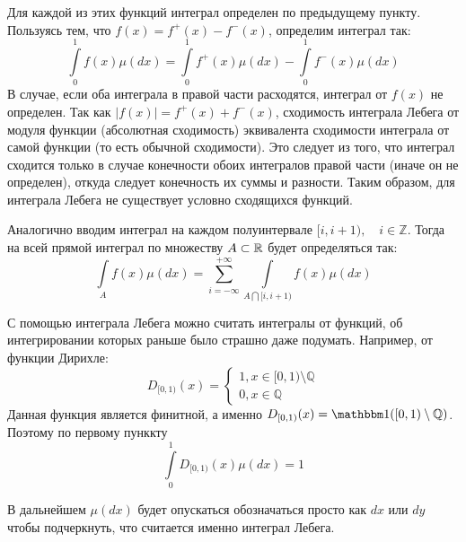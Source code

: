 \begin{itemize}
	Для каждой из этих функций интеграл определен по предыдущему пункту. Пользуясь тем, что $f(x) = f^+(x) - f^-(x)$, определим интеграл так:
	$$  \int\limits_0^1 f(x) \mu(dx) =  \int\limits_0^1 f^+(x) \mu(dx) - \int\limits_0^1 f^-(x) \mu(dx) $$
	В случае, если оба интеграла в правой части расходятся, интеграл от $f(x)$ не определен. 
	Так как $|f(x)| = f^+(x) + f^-(x)$, сходимость интеграла Лебега от модуля функции (абсолютная сходимость) эквивалента сходимости интеграла от самой функции
	(то есть обычной сходимости). Это следует из того, что интеграл сходится только в случае конечности обоих интегралов правой части (иначе он не определен), откуда 
	следует конечность их суммы и разности. Таким образом, для интеграла Лебега не существует условно сходящихся функций.
\end{itemize}

	Аналогично вводим интеграл на каждом полуинтервале $[i, i+1), \quad i \in \mathbb{Z}$. Тогда на всей прямой интеграл по множеству $A \subset \mathbb{R}$ будет определяться так:
	$$ \int\limits_A f(x) \mu(dx) = \sum\limits_{i=-\infty}^{+\infty} \int\limits_{A \bigcap [i, i+1)} f(x) \mu(dx) $$
\begin{Ex}
С помощью интеграла Лебега можно считать интегралы от функций, об интегрировании которых раньше было страшно даже подумать. Например, от функции Дирихле:
  \[
  	D_{[0,1)}(x) = 
  	\begin{cases}
  		1, x \in [0,1) \setminus \mathbb{Q} \\
  		0, x \in \mathbb{Q}
  	\end{cases}
  \]
  Данная функция является финитной, а именно $D_{[0,1)}(x) = \Ind([0,1) \setminus \mathbb{Q})$. Поэтому по первому пунккту
  $$ \int\limits_0^1 D_{[0,1)}(x) \mu(dx) = 1 $$
\end{Ex}

  В дальнейшем $\mu(dx)$ будет опускаться обозначаться просто как $dx$ или $dy$ чтобы подчеркнуть, что считается именно интеграл Лебега.
  
 \newpage
\

